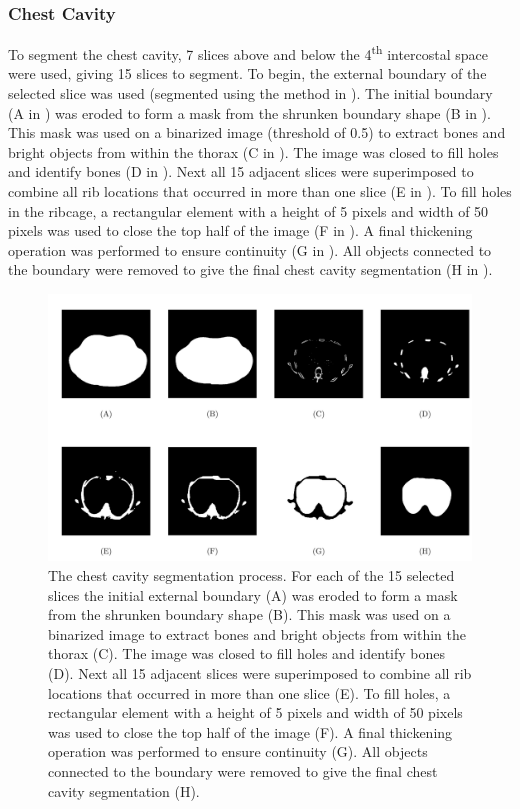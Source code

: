 \subsubsection{Chest Cavity}
To segment the chest cavity, 7 slices above and below the 4\textsuperscript{th}
intercostal space were used, giving 15 slices to segment. 
To begin, the external boundary of the selected slice was
used (segmented using the method in ). 
The initial boundary 
(A in )
was eroded to form a mask from the shrunken boundary shape
(B in ).
This mask was used on a binarized image (threshold of 0.5) to extract bones and bright objects from
within the thorax 
(C in ).
The image was closed to fill  holes and identify bones
(D in ).
Next all 15 adjacent slices were superimposed to combine all rib locations
that occurred in more than one slice
(E in ).
To fill holes in the ribcage, a rectangular 
element with a height of 5 pixels and width of 50 pixels was used to close 
the top half of the image
(F in ).
A final thickening operation was performed to ensure continuity
(G in ).
All objects connected to the boundary were removed 
to give the final chest cavity segmentation
(H in ).

\begin{figure}
	\centering
	\includegraphics[width=\textwidth]{chapter5-CT_to_mesh/imgs/chest_cavity_seg_methods.pdf}
	\caption[Chest cavity segmentation methods.]{\label{fig:cav_seg_methods}%
	The chest cavity segmentation process. For each of the 15 selected slices the initial external boundary (A)
	was eroded to form a mask from the shrunken boundary shape
	(B). This mask was used on a binarized image to extract bones and bright objects from
	within the thorax (C). The image was closed to fill  holes and identify bones
	(D). Next all 15 adjacent slices were superimposed to combine all rib locations
	that occurred in more than one slice (E).
	To fill holes, a rectangular element with a height of 5 pixels and width of 50 pixels was used to close 
	the top half of the image (F).
	A final thickening operation was performed to ensure continuity
	(G). All objects connected to the boundary were removed 
	to give the final chest cavity segmentation (H).
	}
\end{figure}


